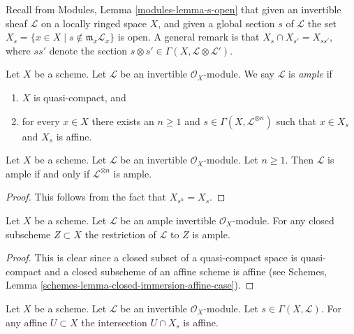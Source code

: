 \noindent
Recall from Modules, Lemma \ref{modules-lemma-s-open}
that given an invertible sheaf $\mathcal{L}$ on a locally ringed
space $X$, and given a global section $s$ of $\mathcal{L}$
the set $X_s = \{x \in X \mid s \not \in \mathfrak m_x\mathcal{L}_x\}$
is open. A general remark is that
$X_s \cap X_{s'} = X_{ss'}$, where $ss'$ denote
the section $s \otimes s' \in \Gamma(X, \mathcal{L} \otimes \mathcal{L}')$.

\begin{definition}
\label{definition-ample}
Let $X$ be a scheme.
Let $\mathcal{L}$ be an invertible $\mathcal{O}_X$-module.
We say $\mathcal{L}$ is {\it ample} if
\begin{enumerate}
\item $X$ is quasi-compact, and
\item for every $x \in X$ there exists an $n \geq 1$
and $s \in \Gamma(X, \mathcal{L}^{\otimes n})$ such
that $x \in X_s$ and $X_s$ is affine.
\end{enumerate}
\end{definition}

\begin{lemma}
\label{lemma-ample-power-ample}
Let $X$ be a scheme. Let $\mathcal{L}$ be an invertible $\mathcal{O}_X$-module.
Let $n \geq 1$. Then $\mathcal{L}$ is ample if and only if
$\mathcal{L}^{\otimes n}$ is ample.
\end{lemma}

\begin{proof}
This follows from the fact that $X_{s^n} = X_s$.
\end{proof}

\begin{lemma}
\label{lemma-ample-on-closed}
Let $X$ be a scheme.
Let $\mathcal{L}$ be an ample invertible $\mathcal{O}_X$-module.
For any closed subscheme $Z \subset X$ the restriction of
$\mathcal{L}$ to $Z$ is ample.
\end{lemma}

\begin{proof}
This is clear since a closed subset of a quasi-compact space is quasi-compact
and a closed subscheme of an affine scheme is affine (see
Schemes, Lemma \ref{schemes-lemma-closed-immersion-affine-case}).
\end{proof}

\begin{lemma}
\label{lemma-affine-cap-s-open}
Let $X$ be a scheme. Let $\mathcal{L}$ be an invertible $\mathcal{O}_X$-module.
Let $s \in \Gamma(X, \mathcal{L})$. For any affine $U \subset X$
the intersection $U \cap X_s$ is affine.
\end{lemma}

